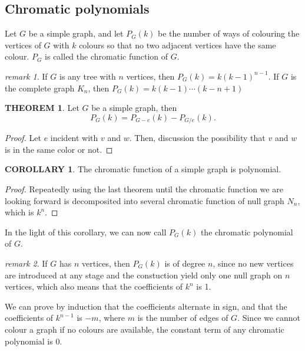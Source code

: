 \documentclass[a4paper,11pt]{article}%
\theoremstyle{remark}
\newtheorem*{remark}{remark}
\theoremstyle{definition}
\newtheorem{theorem}{THEOREM}[section]
\theoremstyle{definition}
\newtheorem{corollary}{COROLLARY}[section]
\theoremstyle{definition}
\theoremstyle{definition}
\theoremstyle{plain}
\theoremstyle{definition}
\begin{document}
\subsection{Chromatic polynomials}
Let $G$ be a simple graph, and let $P_G(k)$ be the number of ways of colouring the vertices of $G$ with $k$ colours 
so that no two adjacent vertices have the same colour. $P_G$ is called the chromatic function of $G$.
\begin{remark}
    If $G$ is any tree with $n$ vertices, then $P_G(k)=k(k-1)^{n-1}$.
    If $G$ is the complete graph $K_n$, then $P_G(k)=k(k-1)\cdots(k-n+1)$
\end{remark}
\begin{theorem}
    Let $G$ be a simple graph, then 
    \[P_G(k)=P_{G-e}(k)-P_{G/e}(k).\]
\end{theorem}
\begin{proof}
    Let $e$ incident with $v$ and $w$. Then, discussion the possibility that $v$ and $w$ is in the same color or not.
\end{proof}
\begin{corollary}
    The chromatic function of a simple graph is polynomial.
\end{corollary}
\begin{proof}
    Repeatedly using the last theorem until the chromatic function we are looking forward is decomposited into several 
    chromatic function of null graph $N_n$, which is $k^n$.
\end{proof}
In the light of this corollary, we can now call $P_G(k)$ the chromatic polynomial of $G$.
\begin{remark}
    If $G$ has $n$ vertices, then $P_G(k)$ is of degree $n$, since no new vertices are introduced at any stage
    and the constuction yield only one null graph on $n$ vertices, which also means that the coefficients of $k^n$ is 1.
\end{remark}
We can prove by induction that the coefficients alternate in sign, and that the coefficients of $k^{n-1}$ is $-m$, where
$m$ is the number of edges of $G$. Since we cannot colour a graph if no colours are available, the constant term of any 
chromatic polynomial is 0.
\end{document}
